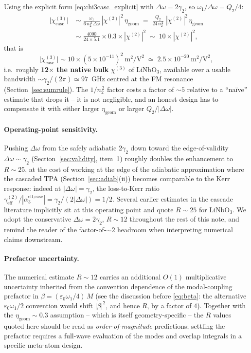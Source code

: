 \documentclass[11pt,a4paper]{article}
\newcommand{\eps}{\varepsilon}
\newcommand{\chitwo}{\chi^{(2)}}
\newcommand{\chithree}{\chi^{(3)}}
\newcommand{\Dom}{\Delta\omega}
\begin{document}
Using the explicit form \eqref{eq:chi3casc_explicit} with $\Dom=2\gamma_2$,
so $\omega_1/\Dom = Q_2/4$:
\begin{align*}
  \bigl|\chithree_\text{casc}\bigr|\;&\sim\;
        \frac{\omega_1}{6\,n_2^{\,2}\,\Dom}\,|\chitwo|^{2}\,\eta_\text{geom}
   \;=\;\frac{Q_2}{24\,n_2^{\,2}}\;|\chitwo|^{2}\,\eta_\text{geom}\\[2pt]
   &\sim\;\frac{4000}{24\times 5.1}\times 0.3\times|\chitwo|^{2}
   \;\sim\;10\times|\chitwo|^{2},
\end{align*}
that is
\begin{equation*}
  \bigl|\chithree_\text{casc}\bigr|\sim
       10\times(5\times10^{-11})^{2}\ \mathrm{m^{2}/V^{2}}
       \;\simeq\;2.5\times10^{-20}\ \mathrm{m^{2}/V^{2}},
\end{equation*}
i.e.\ roughly \textbf{12$\boldsymbol{\times}$ the native bulk}
$\chithree$ of LiNbO$_3$, available over a usable bandwidth
$\sim\gamma_2/(2\pi)\simeq 97$~GHz centred at the FM resonance
(Section~\ref{sec:sumrule}).  The $1/n_2^{\,2}$ factor costs a factor
of $\sim 5$ relative to a ``naïve'' estimate that drops it -- it is
not negligible, and an honest design has to compensate it with either
larger $\eta_\text{geom}$ or larger $Q_2/|\Dom|$.

\paragraph{Operating-point sensitivity.}
Pushing $\Dom$ from the safely adiabatic $2\gamma_2$ down toward the
edge-of-validity $\Dom\!\sim\!\gamma_2$ (Section~\ref{sec:validity},
item~1) roughly doubles the enhancement to $R\!\sim\!25$, at the
cost of working at the edge of the adiabatic approximation where the
cascaded TPA (Section~\ref{sec:adiab}(ii)) becomes comparable to the
Kerr response: indeed at $|\Dom|=\gamma_2$, the loss-to-Kerr ratio
$\gamma_\text{eff}^{(2)}/|\alpha_3^\text{eff,casc}|=\gamma_2/(2|\Dom|)=1/2$.
Several earlier estimates in the cascade literature implicitly sit at
this operating point and quote $R\!\sim\!25$ for LiNbO$_3$.  We adopt
the conservative $\Dom=2\gamma_2$, $R\!\sim\!12$ throughout the rest of
this note, and remind the reader of the factor-of-$\sim\!2$ headroom
when interpreting numerical claims downstream.

\paragraph{Prefactor uncertainty.}  The numerical estimate
$R\!\sim\!12$ carries an additional $O(1)$ multiplicative uncertainty
inherited from the convention dependence of the modal-coupling prefactor
in $\beta=(\eps_0\omega_1/4)\,M$ (see the discussion before
\eqref{eq:beta}: the alternative $\eps_0\omega_1/2$ convention would
shift $|\beta|^2$, and hence $R$, by a factor of $4$).  Together with
the $\eta_\text{geom}\!\sim\!0.3$ assumption -- which is itself
geometry-specific -- the $R$ values quoted here should be read as
\emph{order-of-magnitude} predictions; settling the prefactor requires
a full-wave evaluation of the modes and overlap integrals in a
specific meta-atom design.
\end{document}
